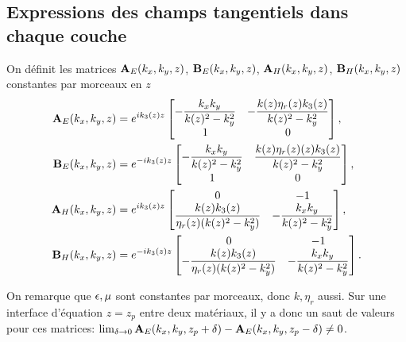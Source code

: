     \subsection{Expressions des champs tangentiels dans chaque couche}

      \begin{defn}
        On définit les matrices \(\mathbf{A}_{E}(k_x,k_y,z)\), \(\mathbf{B}_{E}(k_x,k_y,z)\), \(\mathbf{A}_{H}(k_x,k_y,z)\), \(\mathbf{B}_{H}(k_x,k_y,z)\) constantes par morceaux en \(z\)
        \begin{align*}
          \mathbf{A}_{E}(k_x,k_y,z) &= e^{ik_3(z)z}
          \begin{bmatrix}
            -\dfrac{k_xk_y}{k(z)^2 - k_y^2} & -\dfrac{k(z)\eta_r(z)k_3(z)}{k(z)^2 - k_y^2}
            \\
            1 & 0
          \end{bmatrix},
          \\
          \mathbf{B}_{E}(k_x,k_y,z) &= e^{-ik_3(z)z}
          \begin{bmatrix}
            -\dfrac{k_xk_y}{k(z)^2 - k_y^2} & \dfrac{k(z)\eta_r(z)(z) k_3(z)}{k(z)^2 - k_y^2}
            \\
            1 & 0
          \end{bmatrix},
          \\
          \mathbf{A}_{H}(k_x,k_y,z) &= e^{ik_3(z)z}
          \begin{bmatrix}
            0 & -1
            \\
            \dfrac{k(z)k_3(z)}{\eta_r(z)(k(z)^2 - k_y^2)} & -\dfrac{k_xk_y}{k(z)^2 - k_y^2}
          \end{bmatrix},
          \\
          \mathbf{B}_{H}(k_x,k_y,z) &= e^{-ik_3(z)z}
          \begin{bmatrix}
            0 & -1
            \\
            -\dfrac{k(z)k_3(z)}{\eta_r(z)(k(z)^2 - k_y^2)} & -\dfrac{k_xk_y}{k(z)^2 - k_y^2}
          \end{bmatrix}.
        \end{align*}
      \end{defn}
      On remarque que \(\epsilon,\mu\) sont constantes par morceaux, donc \(k,\eta_r\) aussi.
      Sur une interface d'équation \(z=z_p\) entre deux matériaux, il y a donc un saut de valeurs pour ces matrices: \(\lim_{\delta\rightarrow 0 } \mathbf{A}_E(k_x,k_y,z_p+ \delta) - \mathbf{A}_E(k_x,k_y,z_p - \delta) \not = 0\).
